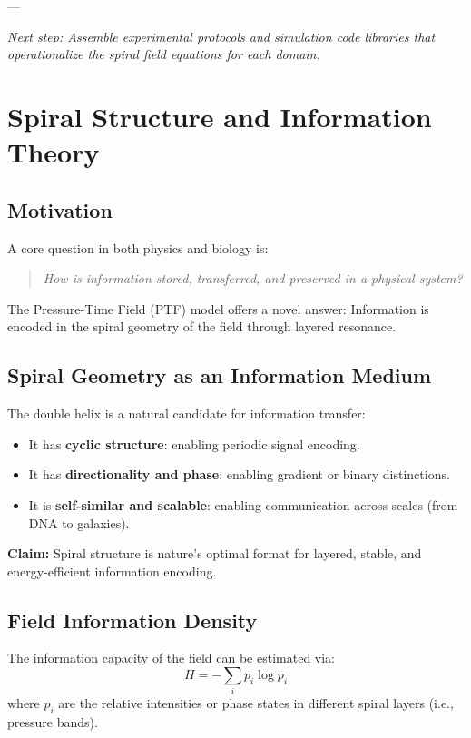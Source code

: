 \documentclass[a4paper,12pt]{article}
\begin{document}
---

\textit{Next step: Assemble experimental protocols and simulation code libraries that operationalize the spiral field equations for each domain.}

\section{Spiral Structure and Information Theory}
\label{sec:information}

\subsection{Motivation}

A core question in both physics and biology is:
\begin{quote}
    \textit{How is information stored, transferred, and preserved in a physical system?}
\end{quote}

The Pressure-Time Field (PTF) model offers a novel answer:  
Information is encoded in the spiral geometry of the field through layered resonance.

\subsection{Spiral Geometry as an Information Medium}

The double helix is a natural candidate for information transfer:
\begin{itemize}
    \item It has \textbf{cyclic structure}: enabling periodic signal encoding.
    \item It has \textbf{directionality and phase}: enabling gradient or binary distinctions.
    \item It is \textbf{self-similar and scalable}: enabling communication across scales (from DNA to galaxies).
\end{itemize}

\textbf{Claim:}  
Spiral structure is nature’s optimal format for layered, stable, and energy-efficient information encoding.

\subsection{Field Information Density}

The information capacity of the field can be estimated via:
\[
H = -\sum_i p_i \log p_i
\]
where \( p_i \) are the relative intensities or phase states in different spiral layers (i.e., pressure bands).
\end{document}
